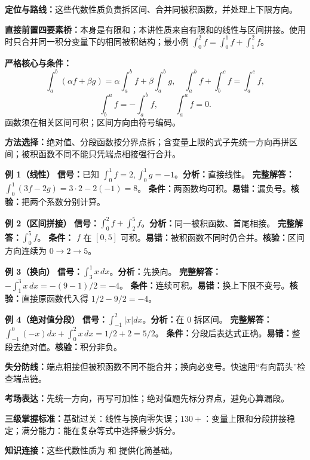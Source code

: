 
\par

\begin{knowledgeBox}
\textbf{定位与路线：}这些代数性质负责拆区间、合并同被积函数，并处理上下限方向。

\textbf{直接前置四要素桥：}本身是有限和；本讲性质来自有限和的线性与区间拼接。使用时只合并同一积分变量下的相同被积结构；最小例 \(\int_0^2f=\int_0^1f+\int_1^2f\)。

\textbf{严格核心与条件：}
\[
\int_a^b(\alpha f+\beta g)=\alpha\int_a^bf+\beta\int_a^bg,\quad
\int_a^bf+\int_b^cf=\int_a^cf,
\]
\[
\int_b^af=-\int_a^bf,\qquad \int_a^af=0.
\]
函数须在相关区间可积；区间方向由符号编码。

\textbf{方法选择：}绝对值、分段函数按分界点拆；含变量上限的式子先统一方向再拼区间；被积函数不同不能只凭端点相接强行合并。

\textbf{例 1（线性）}\quad
\textbf{信号：}已知 \(\int_0^1f=2,\int_0^1g=-1\)。\textbf{分析：}直接线性。
\textbf{完整解答：}\(\int_0^1(3f-2g)=3\cdot2-2(-1)=8\)。
\textbf{条件：}两函数均可积。\textbf{易错：}漏负号。\textbf{核验：}把两个系数分别计算。

\textbf{例 2（区间拼接）}\quad
\textbf{信号：}\(\int_0^2f+\int_2^5f\)。\textbf{分析：}同一被积函数、首尾相接。
\textbf{完整解答：}\(\int_0^5f\)。
\textbf{条件：} \(f\) 在 \([0,5]\) 可积。\textbf{易错：}被积函数不同时仍合并。\textbf{核验：}区间方向连续为 \(0\to2\to5\)。

\textbf{例 3（换向）}\quad
\textbf{信号：}\(\int_3^1x\,dx\)。\textbf{分析：}先换向。
\textbf{完整解答：}\(-\int_1^3x\,dx=-(9-1)/2=-4\)。
\textbf{条件：}连续可积。\textbf{易错：}换上下限不变号。\textbf{核验：}直接原函数代入得 \(1/2-9/2=-4\)。

\textbf{例 4（绝对值分段）}\quad
\textbf{信号：}\(\int_{-1}^2|x|dx\)。\textbf{分析：}在 \(0\) 拆区间。
\textbf{完整解答：}\(\int_{-1}^0(-x)dx+\int_0^2x\,dx=1/2+2=5/2\)。
\textbf{条件：}分段后表达式正确。\textbf{易错：}整段去绝对值。\textbf{核验：}积分非负。

\textbf{失分防线：}端点相接但被积函数不同不能合并；换向必变号。快速用“有向箭头”检查端点链。

\textbf{考场表达：}先统一方向，再写可加性；绝对值题先标分界点，避免心算漏段。

\textbf{三级掌握标准：}基础过关：线性与换向零失误；\(130+\)：变量上限和分段拼接稳定；满分能力：能在复杂等式中选择最少拆分。

\textbf{知识连接：}这些代数性质为 和 提供化简基础。
\end{knowledgeBox}

